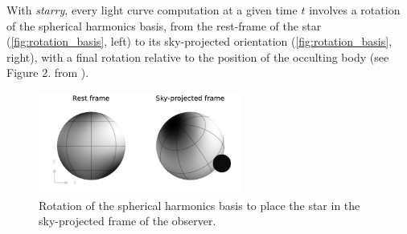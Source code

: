 \documentclass[modern]{aastex631}
\begin{document}

With \textit{starry}, every light curve computation at a given time $t$ involves a rotation of the spherical harmonics basis, from the rest-frame of the star (\autoref{fig:rotation_basis}, left) to its sky-projected orientation (\autoref{fig:rotation_basis}, right), with a final rotation relative to the position of the occulting body (see Figure 2. from \citealt{starry}).
\begin{figure}[H]
    \begin{center}
        \includegraphics[width=0.6\textwidth]{../workflows/rotations/figures/rotation_basis.pdf}
        \caption{Rotation of the spherical harmonics basis to place the star in the sky-projected frame of the observer.}
        \label{fig:rotation_basis}
    \end{center}
\end{figure}
\end{document}
